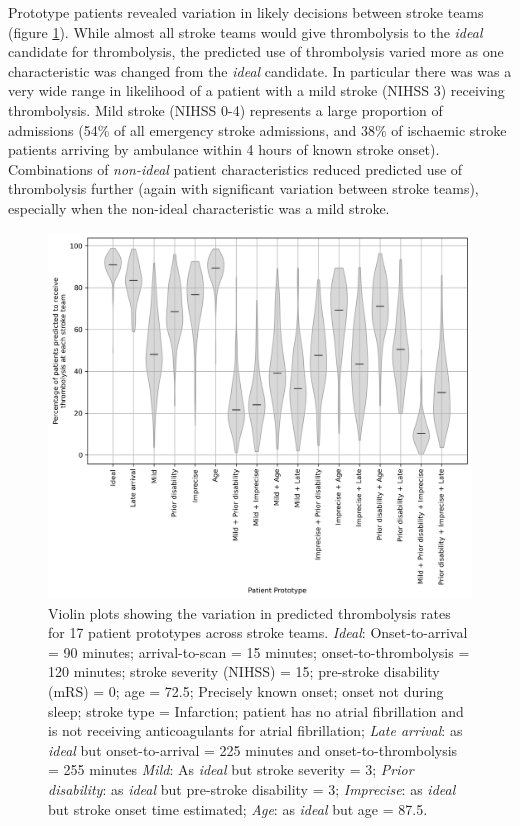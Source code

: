 Prototype patients revealed variation in likely decisions between stroke teams (figure \ref{fig:thrombolysis_rates_prototype_patients}). While almost all stroke teams would give thrombolysis to the \textit{ideal} candidate for thrombolysis, the predicted use of thrombolysis varied more as one characteristic was changed from the \textit{ideal} candidate. In particular there was was a very wide range in likelihood of a patient with a mild stroke (NIHSS 3) receiving thrombolysis. Mild stroke (NIHSS 0-4) represents a large proportion of admissions (54\% of all emergency stroke admissions, and 38\% of ischaemic stroke patients arriving by ambulance within 4 hours of known stroke onset). Combinations of \textit{non-ideal} patient characteristics reduced predicted use of thrombolysis further (again with significant variation between stroke teams), especially when the non-ideal characteristic was a mild stroke.

\begin{figure}
    \centering
    \includegraphics[width=0.75\linewidth]{images/prototype_patients_all_teams}
    \caption{Violin plots showing the variation in predicted thrombolysis rates for 17 patient prototypes across stroke teams. \textit{Ideal}: Onset-to-arrival = 90 minutes; arrival-to-scan = 15 minutes; onset-to-thrombolysis = 120 minutes; stroke severity (NIHSS) = 15; pre-stroke disability (mRS) = 0; age = 72.5; Precisely known onset; onset not during sleep; stroke type = Infarction; patient has no atrial fibrillation and is not receiving anticoagulants for atrial fibrillation; \textit{Late arrival}: as \textit{ideal} but onset-to-arrival = 225 minutes and onset-to-thrombolysis = 255 minutes \textit{Mild}: As \textit{ideal} but stroke severity = 3; \textit{Prior disability}: as \textit{ideal} but pre-stroke disability = 3; \textit{Imprecise}: as \textit{ideal} but stroke onset time estimated; \textit{Age}: as \textit{ideal} but age = 87.5.}
    \label{fig:thrombolysis_rates_prototype_patients}
\end{figure}

